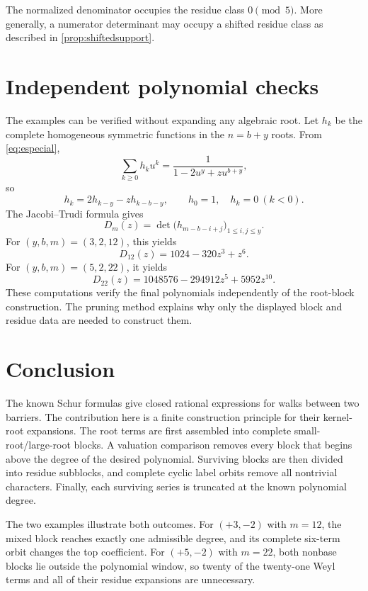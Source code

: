 \documentclass[11pt]{amsart}
\theoremstyle{remark}
\begin{document}
The normalized denominator occupies the residue class $0\pmod5$.  More generally, a numerator determinant may occupy a shifted residue class as described in \cref{prop:shiftedsupport}.

\section{Independent polynomial checks}

The examples can be verified without expanding any algebraic root.  Let $h_k$ be the complete homogeneous symmetric functions in the $n=b+y$ roots.  From \eqref{eq:especial},
\begin{equation}\label{eq:Hseries}
    \sum_{k\geq0}h_k u^k
    =\frac{1}{1-2u^y+zu^{b+y}},
\end{equation}
so
\begin{equation}\label{eq:hrecurrence}
    h_k=2h_{k-y}-zh_{k-b-y},
    \qquad
    h_0=1,
    \quad h_k=0\ (k<0).
\end{equation}
The Jacobi--Trudi formula gives
\begin{equation}\label{eq:JT}
    D_m(z)=
    \det\bigl(h_{m-b-i+j}\bigr)_{1\leq i,j\leq y}.
\end{equation}
For $(y,b,m)=(3,2,12)$, this yields
\[
    D_{12}(z)=1024-320z^3+z^6.
\]
For $(y,b,m)=(5,2,22)$, it yields
\[
    D_{22}(z)=1048576-294912z^5+5952z^{10}.
\]
These computations verify the final polynomials independently of the root-block construction.  The pruning method explains why only the displayed block and residue data are needed to construct them.

\section{Conclusion}

The known Schur formulas give closed rational expressions for walks between two barriers.  The contribution here is a finite construction principle for their kernel-root expansions.  The root terms are first assembled into complete small-root/large-root blocks.  A valuation comparison removes every block that begins above the degree of the desired polynomial.  Surviving blocks are then divided into residue subblocks, and complete cyclic label orbits remove all nontrivial characters.  Finally, each surviving series is truncated at the known polynomial degree.

The two examples illustrate both outcomes.  For $(+3,-2)$ with $m=12$, the mixed block reaches exactly one admissible degree, and its complete six-term orbit changes the top coefficient.  For $(+5,-2)$ with $m=22$, both nonbase blocks lie outside the polynomial window, so twenty of the twenty-one Weyl terms and all of their residue expansions are unnecessary.
\end{document}
